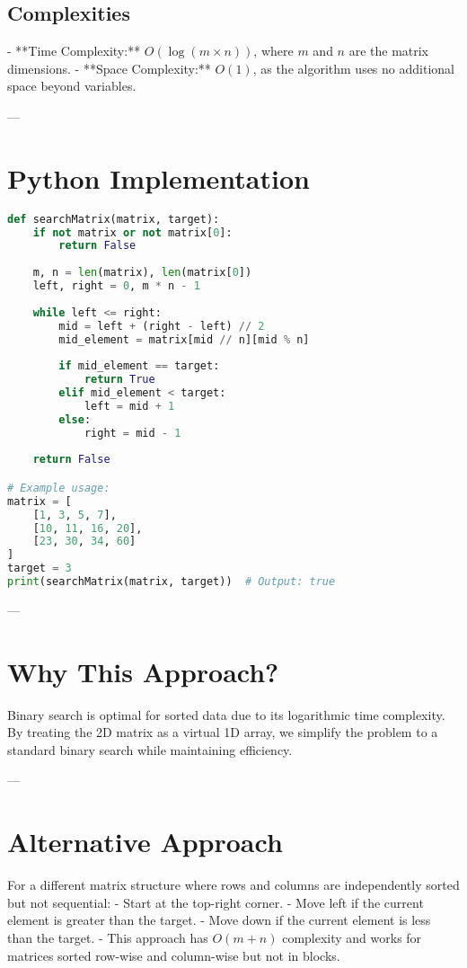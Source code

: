 \subsection*{Complexities}
- **Time Complexity:** \(O(\log(m \times n))\), where \(m\) and \(n\) are the matrix dimensions.
- **Space Complexity:** \(O(1)\), as the algorithm uses no additional space beyond variables.

---

\section*{Python Implementation}
\begin{fullwidth}
\begin{lstlisting}[language=Python]
def searchMatrix(matrix, target):
    if not matrix or not matrix[0]:
        return False
    
    m, n = len(matrix), len(matrix[0])
    left, right = 0, m * n - 1
    
    while left <= right:
        mid = left + (right - left) // 2
        mid_element = matrix[mid // n][mid % n]
        
        if mid_element == target:
            return True
        elif mid_element < target:
            left = mid + 1
        else:
            right = mid - 1
    
    return False

# Example usage:
matrix = [
    [1, 3, 5, 7],
    [10, 11, 16, 20],
    [23, 30, 34, 60]
]
target = 3
print(searchMatrix(matrix, target))  # Output: true
\end{lstlisting}
\end{fullwidth}

---

\section*{Why This Approach?}
Binary search is optimal for sorted data due to its logarithmic time complexity. By treating the 2D matrix as a virtual 1D array, we simplify the problem to a standard binary search while maintaining efficiency.

---

\section*{Alternative Approach}
For a different matrix structure where rows and columns are independently sorted but not sequential:
- Start at the top-right corner.
- Move left if the current element is greater than the target.
- Move down if the current element is less than the target.
- This approach has \(O(m + n)\) complexity and works for matrices sorted row-wise and column-wise but not in blocks.

